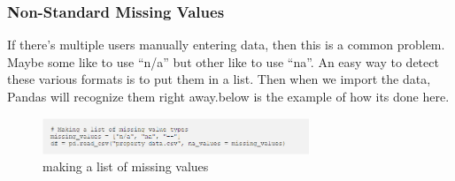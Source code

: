 \documentclass[oneside,12pt]{Classes/VTU}
\begin{document}
	\subsubsection{Non-Standard Missing Values}
	If there’s multiple users manually entering data, then this is a common problem. Maybe some like to use “n/a” but other like to use “na”. An easy way to detect these various formats is to put them in a list. Then when we import the data, Pandas will recognize them right away.below is the example of how its done here.
	\begin{figure}
  	\begin{center}
  			\includegraphics[width=8cm]{images/datacleaning.png}
  			\caption{making a list of missing values}
  	\end{center}
  \end{figure}
  
\end{document}
